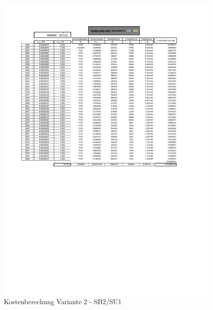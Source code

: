 \begin{figure}[h!]
	\centering
	\includegraphics[width=\textwidth]{figures/Anhang/f-00-A-V2-B2-U1}
	\caption{Kostenberechung Variante 2 - SB2/SU1}
\end{figure}

